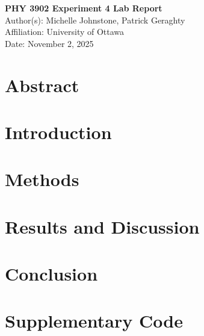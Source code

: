 \documentclass[12pt,a4paper]{article}
\begin{document}
\begin{center}
    {\LARGE\bfseries PHY 3902 Experiment 4 Lab Report}\\[1.5em]
    {\large Author(s): Michelle Johnstone, Patrick Geraghty}\\
    {\large Affiliation: University of Ottawa}\\
    {\large Date: November 2, 2025}
\end{center}

\section{Abstract}\label{sec:abstract}


\section{Introduction}\label{sec:introduction}


\section{Methods}\label{sec:methods}


\section{Results and Discussion}\label{sec:results_and_discussion}


\section{Conclusion}\label{sec:conclusion}





\appendix
\section{Supplementary Code}\label{sec:supplementary-code}


\end{document}
